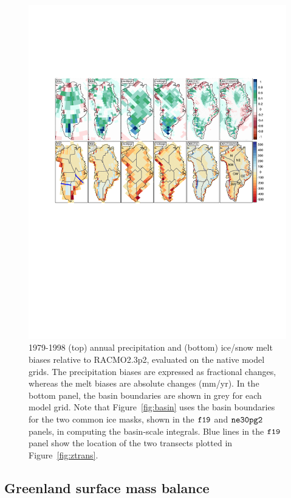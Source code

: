 \documentclass[draft]{agujournal2019}
\begin{document}
\begin{figure}[t]
\begin{center}
         \includegraphics[width=130mm]{temp_contours_diffRACMO}
\end{center}
\caption{1979-1998 (top) annual precipitation and (bottom) ice/snow melt biases relative to RACMO2.3p2, evaluated on the native model grids. The precipitation biases are expressed as fractional changes, whereas the melt biases are absolute changes (mm/yr). In the bottom panel, the  basin boundaries are shown in grey for each model grid. Note that Figure~\ref{fig:basin} uses the basin boundaries for the two common ice masks, shown in the $\tt f19$ and $\tt ne30pg2$ panels, in computing the basin-scale integrals. Blue lines in the $\tt f19$ panel show the location of the two transects plotted in Figure~\ref{fig:ztrans}.}
\label{fig:prect}
\end{figure}

\subsection{Greenland surface mass balance}
\end{document}
